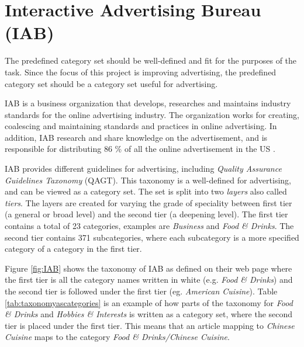 \section{Interactive Advertising Bureau (IAB)}
The predefined category set should be well-defined and fit for the purposes of the task. Since the focus of this project is improving advertising, the predefined category set should be a category set useful for advertising. 




IAB is a business organization that develops, researches and maintains industry standards for the online advertising industry. The organization works for creating, coalescing and maintaining standards and practices in online advertising. In addition, IAB research and share knowledge on the advertisement, and is responsible for distributing 86 \% of all the online advertisement in the US \cite{IABabout}.

IAB provides different guidelines for advertising, including \emph{Quality Assurance Guidelines Taxonomy} (QAGT). This taxonomy is a well-defined for advertising, and can be viewed as a category set. The set is split into two \emph{layers} also called \emph{tiers}. The layers are created for varying the grade of speciality between first tier (a general or broad level) and the second tier (a deepening level). The first tier contains a total of 23 categories, examples are \emph{Business} and \emph{Food \& Drinks}. The second tier contains 371 subcategories, where each subcategory is a more specified category of a category in the first tier. 

Figure \ref{fig:IAB} shows the taxonomy of IAB as defined on their web page where the first tier is all the category names written in white (e.g. \emph{Food \& Drinks}) and the second tier is followed under the first tier (eg. \emph{American Cuisine}). Table \ref{tab:taxonomyascategories} is an example of how parts of the taxonomy for \emph{Food \& Drinks} and \emph{Hobbies \& Interests} is written as a category set, where the second tier is placed under the first tier. This means that an article mapping to \emph{Chinese Cuisine} maps to the category \emph{Food \& Drinks/Chinese Cuisine}.

